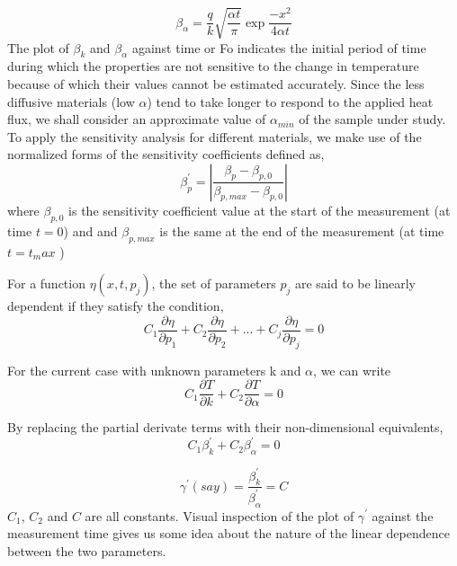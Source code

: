 \documentclass[12pt]{report}
\begin{document}
\begin{equation}
\beta_{\alpha} = \frac{q}{k}\sqrt{\frac{\alpha t}{\pi}}\exp{\frac{-x^2}{4 \alpha t}}
\end{equation}
The plot of $\beta_{k}$ and $\beta_{\alpha}$ against time or Fo
indicates the initial period of time during which the properties are not
sensitive to the change in temperature because of which their values
cannot be estimated accurately. Since the less diffusive materials (low
\(\alpha\)) tend to take longer to respond to the applied heat flux, we
shall consider an approximate value of $\alpha_{min}$ of the sample
under study. To apply the sensitivity analysis for different materials, we make use of the
normalized forms of the sensitivity coefficients defined as,
\begin{equation}
\beta_p^{'} =\left|\frac{\beta_p - \beta_{p,0}}{\beta_{p,max} - \beta_{p,0}}\right|
\end{equation}
 where $\beta_{p,0}$ is the sensitivity coefficient value at the start
of the measurement (at time $t = 0$) and and $ \beta_{p,max}$ is the
same at the end of the measurement (at time $t=t_max$ )



For a function $ \eta(x,t,p_j) $, the set of parameters $p_j $ are said to be linearly dependent if they satisfy the condition,
\begin{equation}
	C_1 \frac{\partial \eta}{\partial p_1} + C_2 \frac{\partial \eta}{\partial p_2} + ... +  C_j \frac{\partial \eta}{\partial p_j} = 0
\end{equation}

For the current case with unknown parameters k and $\alpha$, we can write
\begin{equation*}
 C_1 \frac{\partial T}{\partial k} + C_2 \frac{\partial T}{\partial \alpha} = 0 
\end{equation*}


By replacing the partial derivate terms with their non-dimensional equivalents,
\begin{equation*}
 C_1 \beta_{k}^{'} + C_2 \beta_{\alpha}^{'} = 0
\end{equation*}

\begin{equation*}
 \gamma^{'} (say) = \frac{\beta_k^{'}}{\beta_{\alpha}^{'}} = C
\end{equation*}
$C_1$, $C_2$ and $C$ are all constants. Visual inspection of the
 plot of $\gamma^{'}$ against the measurement time gives us some idea 
about the nature of the linear dependence between the two parameters.   
\end{document}
